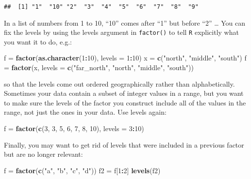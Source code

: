 \documentclass[11pt,]{article}
\newenvironment{Shaded}{\begin{snugshade}}{\end{snugshade}}
\newcommand{\KeywordTok}[1]{\textcolor[rgb]{0.13,0.29,0.53}{\textbf{#1}}}
\newcommand{\DataTypeTok}[1]{\textcolor[rgb]{0.13,0.29,0.53}{#1}}
\newcommand{\DecValTok}[1]{\textcolor[rgb]{0.00,0.00,0.81}{#1}}
\newcommand{\StringTok}[1]{\textcolor[rgb]{0.31,0.60,0.02}{#1}}
\newcommand{\OperatorTok}[1]{\textcolor[rgb]{0.81,0.36,0.00}{\textbf{#1}}}
\newcommand{\NormalTok}[1]{#1}
\begin{document}
\begin{verbatim}
##  [1] "1"  "10" "2"  "3"  "4"  "5"  "6"  "7"  "8"  "9"
\end{verbatim}

In a list of numbers from 1 to 10, ``10'' comes after ``1'' but before
``2'' \ldots{} You can fix the levels by using the levels argument in
\texttt{factor()} to tell \texttt{R} explicitly what you want it to do,
e.g.:

\begin{Shaded}
\begin{Highlighting}[]
\NormalTok{f =}\StringTok{ }\KeywordTok{factor}\NormalTok{(}\KeywordTok{as.character}\NormalTok{(}\DecValTok{1}\OperatorTok{:}\DecValTok{10}\NormalTok{), }\DataTypeTok{levels =} \DecValTok{1}\OperatorTok{:}\DecValTok{10}\NormalTok{)}
\NormalTok{x =}\StringTok{ }\KeywordTok{c}\NormalTok{(}\StringTok{"north"}\NormalTok{, }\StringTok{"middle"}\NormalTok{, }\StringTok{"south"}\NormalTok{)}
\NormalTok{f =}\StringTok{ }\KeywordTok{factor}\NormalTok{(x, }\DataTypeTok{levels =} \KeywordTok{c}\NormalTok{(}\StringTok{"far_north"}\NormalTok{, }\StringTok{"north"}\NormalTok{, }\StringTok{"middle"}\NormalTok{, }\StringTok{"south"}\NormalTok{))}
\end{Highlighting}
\end{Shaded}

so that the levels come out ordered geographically rather than
alphabetically. Sometimes your data contain a subset of integer values
in a range, but you want to make sure the levels of the factor you
construct include all of the values in the range, not just the ones in
your data. Use levels again:

\begin{Shaded}
\begin{Highlighting}[]
\NormalTok{f =}\StringTok{ }\KeywordTok{factor}\NormalTok{(}\KeywordTok{c}\NormalTok{(}\DecValTok{3}\NormalTok{, }\DecValTok{3}\NormalTok{, }\DecValTok{5}\NormalTok{, }\DecValTok{6}\NormalTok{, }\DecValTok{7}\NormalTok{, }\DecValTok{8}\NormalTok{, }\DecValTok{10}\NormalTok{), }\DataTypeTok{levels =} \DecValTok{3}\OperatorTok{:}\DecValTok{10}\NormalTok{)}
\end{Highlighting}
\end{Shaded}

Finally, you may want to get rid of levels that were included in a
previous factor but are no longer relevant:

\begin{Shaded}
\begin{Highlighting}[]
\NormalTok{f =}\StringTok{ }\KeywordTok{factor}\NormalTok{(}\KeywordTok{c}\NormalTok{(}\StringTok{"a"}\NormalTok{, }\StringTok{"b"}\NormalTok{, }\StringTok{"c"}\NormalTok{, }\StringTok{"d"}\NormalTok{))}
\NormalTok{f2 =}\StringTok{ }\NormalTok{f[}\DecValTok{1}\OperatorTok{:}\DecValTok{2}\NormalTok{]}
\KeywordTok{levels}\NormalTok{(f2)}
\end{Highlighting}
\end{Shaded}
\end{document}
